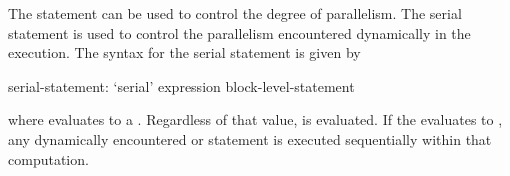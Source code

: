 The  statement can be used to control the degree of parallelism.
The serial statement is used to control the parallelism encountered
dynamically in the execution.  The syntax for the serial statement is
given by
\begin{syntax}
serial-statement:
  `serial' expression block-level-statement
\end{syntax}
where  evaluates to a .  Regardless of
that value,  is evaluated. If
the  evaluates to , any dynamically
encountered  or  statement is executed
sequentially within that computation.


